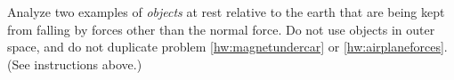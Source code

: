 Analyze two examples of \emph{objects} at rest relative
to the earth that are being kept from falling by forces
other than the normal force. Do not use objects in outer
space, and do not duplicate problem \ref{hw:magnetundercar} or \ref{hw:airplaneforces}.
(See instructions above.)
